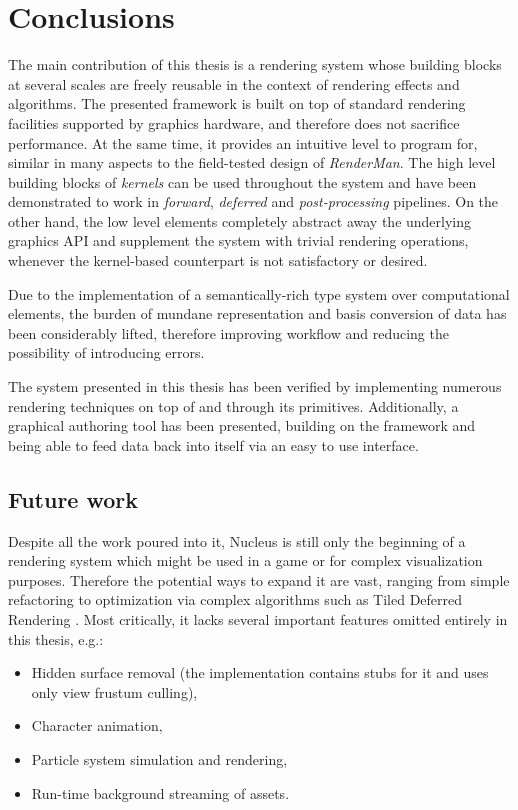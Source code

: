 
\chapter{ Conclusions }
\label{Chapter7}

The main contribution of this thesis is a rendering system whose building blocks at several scales are freely reusable in the context of rendering effects and algorithms. The presented framework is built on top of standard rendering facilities supported by graphics hardware, and therefore does not sacrifice performance. At the same time, it provides an intuitive level to program for, similar in many aspects to the field-tested design of \emph{RenderMan}. The high level building blocks of \emph{kernels} can be used throughout the system and have been demonstrated to work in \emph{forward}, \emph{deferred} and \emph{post-processing} pipelines. On the other hand, the low level elements completely abstract away the underlying graphics API and supplement the system with trivial rendering operations, whenever the kernel-based counterpart is not satisfactory or desired.

Due to the implementation of a semantically-rich type system over computational elements, the burden of mundane representation and basis conversion of data has been considerably lifted, therefore improving workflow and reducing the possibility of introducing errors.

The system presented in this thesis has been verified by implementing numerous rendering techniques on top of and through its primitives. Additionally, a graphical authoring tool has been presented, building on the framework and being able to feed data back into itself via an easy to use interface.

\section{Future work}

Despite all the work poured into it, Nucleus is still only the beginning of a rendering system which might be used in a game or for complex visualization purposes. Therefore the potential ways to expand it are vast, ranging from simple refactoring to optimization via complex algorithms such as Tiled Deferred Rendering \cite{tiledDeferred}. Most critically, it lacks several important features omitted entirely in this thesis, e.g.:
\begin{itemize}
\item Hidden surface removal (the implementation contains stubs for it and uses only view frustum culling),
\item Character animation,
\item Particle system simulation and rendering,
\item Run-time background streaming of assets.
\end{itemize}

